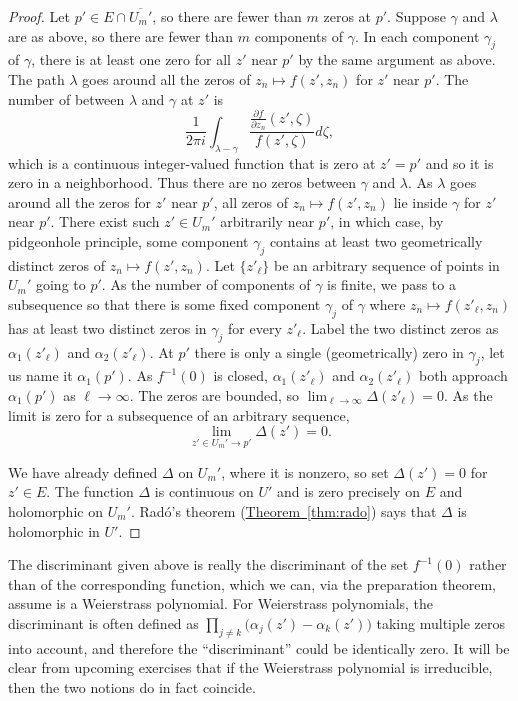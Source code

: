 \documentclass[12pt,openany]{book}
\theoremstyle{plain}
\theoremstyle{remark}
\theoremstyle{definition}
\theoremstyle{exercise}
\theoremstyle{example}
\newcommand{\thmref}[1]{\hyperref[#1]{Theorem~\ref*{#1}}}
\begin{document}
\begin{proof}
Let $p' \in E \cap \overline{U_m'}$,
so there are fewer than $m$ zeros at $p'$.
Suppose $\gamma$ and $\lambda$ are as above, so there are fewer than $m$
components of $\gamma$.
In each component $\gamma_j$ of $\gamma$, there is
at least one zero for all $z'$ near $p'$ by the same argument as above.
The path $\lambda$ goes around all the zeros of 
$z_n \mapsto f(z',z_n)$ for $z'$ near $p'$.
The number of between $\lambda$ and $\gamma$ at $z'$ is
\begin{equation*}
\frac{1}{2\pi i}
\int_{\lambda - \gamma}
\frac{\frac{\partial f}{\partial z_n}(z',\zeta)}{f(z',\zeta)} d\zeta ,
\end{equation*}
which is a continuous integer-valued function that is zero at $z'=p'$
and so it is zero in a neighborhood.  Thus there are no zeros between
$\gamma$ and $\lambda$.
As $\lambda$ goes around all the zeros for $z'$ near $p'$,
all zeros of $z_n \mapsto f(z',z_n)$
lie inside $\gamma$ for $z'$ near $p'$.
There exist such $z' \in U_m'$ arbitrarily near $p'$,
in which case, by pidgeonhole principle, some
component $\gamma_j$ contains at least two geometrically distinct zeros of
$z_n \mapsto f(z',z_n)$.
Let $\{ z'_\ell \}$
be an arbitrary sequence of points in $U_m'$ going to $p'$.
As the number of components of $\gamma$ is finite, we pass to a subsequence
so that there is some fixed component $\gamma_j$ of $\gamma$
where
$z_n \mapsto f(z'_\ell,z_n)$ has at least two distinct zeros in $\gamma_j$ for every $z'_\ell$.
Label the two distinct zeros
as $\alpha_1(z'_\ell)$ and $\alpha_2(z'_\ell)$.
At $p'$ there is only a single (geometrically) zero in $\gamma_j$, let
us name it $\alpha_1(p')$.
As $f^{-1}(0)$ is closed,
$\alpha_1(z'_\ell)$ and $\alpha_2(z'_\ell)$ both approach $\alpha_1(p')$ as
$\ell \to \infty$.
The zeros are bounded, so
$\lim_{\ell \to \infty} \Delta(z'_\ell) = 0$.  As the limit is zero for a
subsequence of an arbitrary sequence,
\begin{equation*}
\lim_{z' \in U_m' \to p'} \Delta(z') = 0 .
\end{equation*}

We have already defined $\Delta$ on $U_m'$, where it is nonzero,
so set $\Delta(z') = 0$ for $z' \in E$.
The function $\Delta$ is continuous on $U'$ and is zero precisely on
$E$ and holomorphic on $U_m'$.
Rad{\'o}'s theorem
(\thmref{thm:rado}) says that $\Delta$ is holomorphic in $U'$.
\end{proof}

The discriminant given above is really the discriminant of the set
$f^{-1}(0)$ rather than of the corresponding function, which we can,
via the preparation theorem, assume is a Weierstrass polynomial.
For Weierstrass polynomials, the discriminant is often defined as
$\prod_{j \not= k} \bigl( \alpha_j(z') - \alpha_k(z') \bigr)$ taking
multiple zeros into account, and therefore the ``discriminant'' could be
identically zero.  It will be clear from upcoming exercises that if
the Weierstrass polynomial is irreducible, then the two notions do in fact
coincide.
\end{document}
